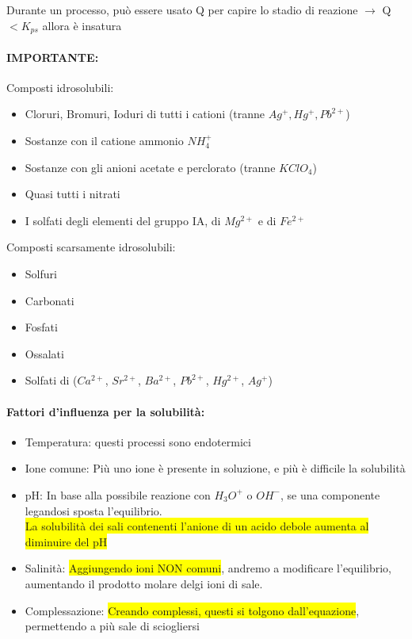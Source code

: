 \documentclass{article}
\begin{document}
Durante un processo, può essere usato Q per capire lo stadio di reazione $\rightarrow$ Q $< K_{ps}$ allora è insatura

\paragraph{IMPORTANTE:} 
Composti idrosolubili:
\begin{itemize}
	\item Cloruri, Bromuri, Ioduri di tutti i cationi (tranne $Ag^+, Hg^+, Pb^{2+}$)
	\item Sostanze con il catione ammonio $NH_4^+$
	\item Sostanze con gli anioni acetate e perclorato (tranne $KClO_4$)
	\item Quasi tutti i nitrati
	\item I solfati degli elementi del gruppo IA, di $Mg^{2+}$ e di $Fe^{2+}$
\end{itemize}
Composti scarsamente idrosolubili:
\begin{itemize}
	\item Solfuri
	\item Carbonati
	\item Fosfati
	\item Ossalati
	\item Solfati di ($Ca^{2+}$, $Sr^{2+}$, $Ba^{2+}$, $Pb^{2+}$, $Hg^{2+}$, $Ag^{+}$)
\end{itemize}

\paragraph{Fattori d'influenza per la solubilità:} 
\begin{itemize}
	\item Temperatura: questi processi sono endotermici
	\item Ione comune: Più uno ione è presente in soluzione, e più è difficile la solubilità
	\item pH: In base alla possibile reazione con $H_3O^+$ o $OH^-$, se una componente legandosi sposta l'equilibrio. 
	\\\colorbox{yellow}{La solubilità dei sali contenenti l'anione di un acido debole aumenta al diminuire del pH}
	\item Salinità: \colorbox{yellow}{Aggiungendo ioni NON comuni}, andremo a modificare l'equilibrio, aumentando il prodotto molare delgi ioni di sale.
	\item Complessazione: \colorbox{yellow}{Creando complessi, questi si tolgono dall'equazione}, permettendo a più sale di sciogliersi
\end{itemize}
\end{document}
